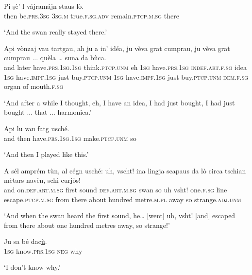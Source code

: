 \begin{linenumbers}
\gll   Pi ṣè’ l vájramájn staus lò. \\
then be.\textsc{prs.3sg} \textsc{3sg.m} true.\textsc{f.sg.adv} remain.\textsc{ptcp.m.sg} there\\
\end{linenumbers}
\medskip
\glt `And the swan really stayed there.'
\medskip

\begin{linenumbers}
\gll Api vònzaj vau tartgau, ah ju a in’ idéa, ju vèva grat cumprau, ju vèva grat cumprau ... quèla … suna da bùca.   \\
and later have.\textsc{prs.1sg.1sg} think.\textsc{ptcp.unm} eh \textsc{1sg} have.\textsc{prs.1sg} \textsc{indef.art.f.sg} idea \textsc{1sg} have.\textsc{impf.1sg} just buy.\textsc{ptcp.unm}  \textsc{1sg} have.\textsc{impf.1sg} just buy.\textsc{ptcp.unm} {} \textsc{dem.f.sg} {} organ of mouth.\textsc{f.sg} \\
\end{linenumbers}
\medskip
\glt `And after a while I thought, eh, I have an idea, I had just bought, I had just bought ... that ... harmonica.'
\medskip

\begin{linenumbers}
\gll  Api lu vau fatg usché.\footnotemark  \\
and then have.\textsc{prs.1sg.1sg} make.\textsc{ptcp.unm} so \\
\end{linenumbers}
\medskip
\glt `And then I played like this.'
\medskip

\begin{linenumbers}
\gll  A sél amprém tùn, al cégn usché: uh, vscht! ina lingja scapaus da lò circa tschian mètars navèn, schi curjòs!  \\
and on.\textsc{def.art.m.sg} first sound \textsc{def.art.m.sg} swan so uh vsht! one.\textsc{f.sg} line escape.\textsc{ptcp.m.sg} from there about hundred metre.\textsc{m.pl} away so strange.\textsc{adj.unm} \\
\end{linenumbers}
\medskip
\glt `And when the swan heard the first sound, he… [went] uh, vsht! [and] escaped from there about one hundred metres away, so strange!'
\medskip

\begin{linenumbers}
\gll Ju sa bé dac\underline{ù}.   \\
 \textsc{1sg} know.\textsc{prs.1sg} \textsc{neg} why \\
\end{linenumbers}
\medskip
\glt `I don’t know why.'
\medskip

